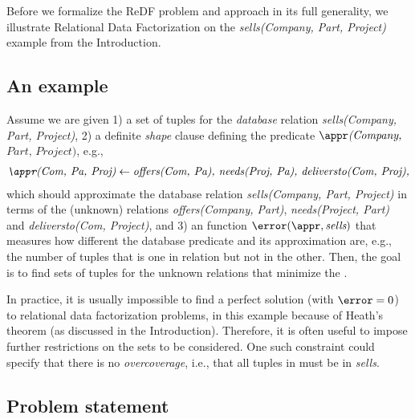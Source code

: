 
Before we formalize the ReDF problem and approach in its full generality, we illustrate Relational Data Factorization on the \textit{sells(Company, Part, Project)} example from the Introduction.

\subsection{An example}

Assume we are given 1) a set of tuples for the {\em database} relation \textit{sells(Company, Part, Project)},
2) a definite {\em shape} clause defining the predicate $\appr\textit{(Company,}$ $\textit{Part, Project)}$, e.g.,
\begin{align*}
 \textit{\appr(Com, Pa, Proj)} \leftarrow \textit{offers(Com, Pa), needs(Proj, Pa), deliversto(Com, Proj),}
\end{align*}
 which should approximate the database relation \textit{sells(Company, Part, Project)} in
 terms of the (unknown) relations \textit{offers(Company, Part)}, \textit{needs(Project, Part)} and \textit{deliversto(Com, Project)},
 and
3)   an   \error function $\error(\appr, \textit{sells})$ that measures how 
different the database predicate 
and its approximation are, e.g., the number of tuples that is one in relation but not in the other. 
Then, the goal is to find sets of tuples for the unknown relations that minimize the \error. 

In practice, it is usually impossible to find a perfect solution (with $\error=0$) to relational data factorization problems, in this example because of Heath's theorem \citep{heath_theorem} (as discussed in the Introduction). Therefore, it is often useful to impose further restrictions on the sets to be considered. One such constraint could specify that there is no {\em overcoverage}, i.e., that all tuples in \appr must be in \textit{sells}.

\subsection{Problem statement}

